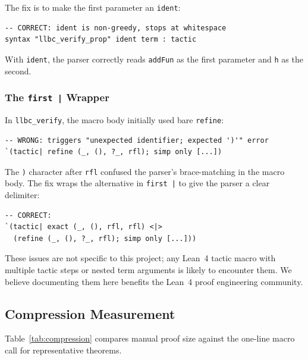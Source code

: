 The fix is to make the first parameter an \texttt{ident}:

\begin{lstlisting}[caption={Fixed macro definition.},label={lst:fixed}]
-- CORRECT: ident is non-greedy, stops at whitespace
syntax "llbc_verify_prop" ident term : tactic
\end{lstlisting}

With \texttt{ident}, the parser correctly reads \texttt{addFun} as the
first parameter and \texttt{h} as the second.

\subsubsection{The \texttt{first |} Wrapper}

In \texttt{llbc\_verify}, the macro body initially used bare \texttt{refine}:

\begin{lstlisting}
-- WRONG: triggers "unexpected identifier; expected ')'" error
`(tactic| refine (_, (), ?_, rfl); simp only [...])
\end{lstlisting}

The \texttt{)} character after \texttt{rfl} confused the parser's
brace-matching in the macro body. The fix wraps the alternative in
\texttt{first |} to give the parser a clear delimiter:

\begin{lstlisting}
-- CORRECT:
`(tactic| exact (_, (), rfl, rfl) <|>
  (refine (_, (), ?_, rfl); simp only [...]))
\end{lstlisting}

These issues are not specific to this project; any Lean~4 tactic macro with
multiple tactic steps or nested term arguments is likely to encounter them.
We believe documenting them here benefits the Lean~4 proof engineering
community.

\subsection{Compression Measurement}

Table~\ref{tab:compression} compares manual proof size against the one-line
macro call for representative theorems.

